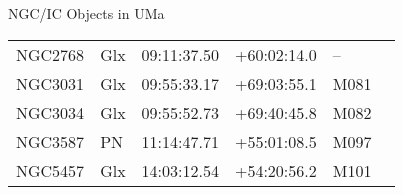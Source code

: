\begin{block}{NGC/IC Objects in UMa}
  \centering
  \begin{tabularx}{\textwidth}{llrrll} 
    NGC2768 & Glx & 09:11:37.50 & +60:02:14.0  & -- \\ 
    NGC3031 & Glx & 09:55:33.17 & +69:03:55.1  & M081 \\ 
    NGC3034 & Glx & 09:55:52.73 & +69:40:45.8  & M082 \\ 
    NGC3587 & PN & 11:14:47.71 & +55:01:08.5  & M097 \\ 
    NGC5457 & Glx & 14:03:12.54 & +54:20:56.2  & M101 \\ 
  \end{tabularx}
\end{block}